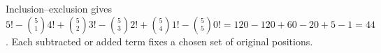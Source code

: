 Inclusion--exclusion gives $5!-\binom51 4!+\binom52 3!-\binom53 2!+\binom54 1!-\binom55 0!=120-120+60-20+5-1=\boxed{44}$. Each subtracted or added term fixes a chosen set of original positions.
